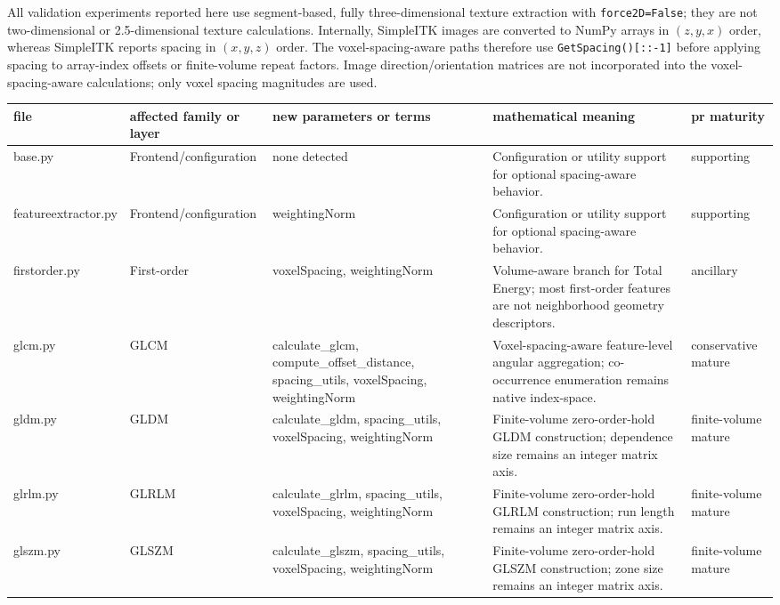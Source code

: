 \documentclass[11pt]{article}
\begin{document}
All validation experiments reported here use segment-based, fully three-dimensional texture extraction with \texttt{force2D=False}; they are not two-dimensional or 2.5-dimensional texture calculations. Internally, SimpleITK images are converted to NumPy arrays in \((z,y,x)\) order, whereas SimpleITK reports spacing in \((x,y,z)\) order. The voxel-spacing-aware paths therefore use \texttt{GetSpacing()[::-1]} before applying spacing to array-index offsets or finite-volume repeat factors. Image direction/orientation matrices are not incorporated into the voxel-spacing-aware calculations; only voxel spacing magnitudes are used.

\begin{table}[t]
\centering
\small
\begin{tabular}{p{}p{}p{}p{}p{}}
\toprule
file & affected family or layer & new parameters or terms & mathematical meaning & pr maturity \\
\midrule
base.py & Frontend/configuration & none detected & Configuration or utility support for optional spacing-aware behavior. & supporting \\
featureextractor.py & Frontend/configuration & weightingNorm & Configuration or utility support for optional spacing-aware behavior. & supporting \\
firstorder.py & First-order & voxelSpacing, weightingNorm & Volume-aware branch for Total Energy; most first-order features are not neighborhood geometry descriptors. & ancillary \\
glcm.py & GLCM & calculate\_glcm, compute\_offset\_distance, spacing\_utils, voxelSpacing, weightingNorm & Voxel-spacing-aware feature-level angular aggregation; co-occurrence enumeration remains native index-space. & conservative mature \\
gldm.py & GLDM & calculate\_gldm, spacing\_utils, voxelSpacing, weightingNorm & Finite-volume zero-order-hold GLDM construction; dependence size remains an integer matrix axis. & finite-volume mature \\
glrlm.py & GLRLM & calculate\_glrlm, spacing\_utils, voxelSpacing, weightingNorm & Finite-volume zero-order-hold GLRLM construction; run length remains an integer matrix axis. & finite-volume mature \\
glszm.py & GLSZM & calculate\_glszm, spacing\_utils, voxelSpacing, weightingNorm & Finite-volume zero-order-hold GLSZM construction; zone size remains an integer matrix axis. & finite-volume mature \\

\end{tabular}
\end{table}
\end{document}
